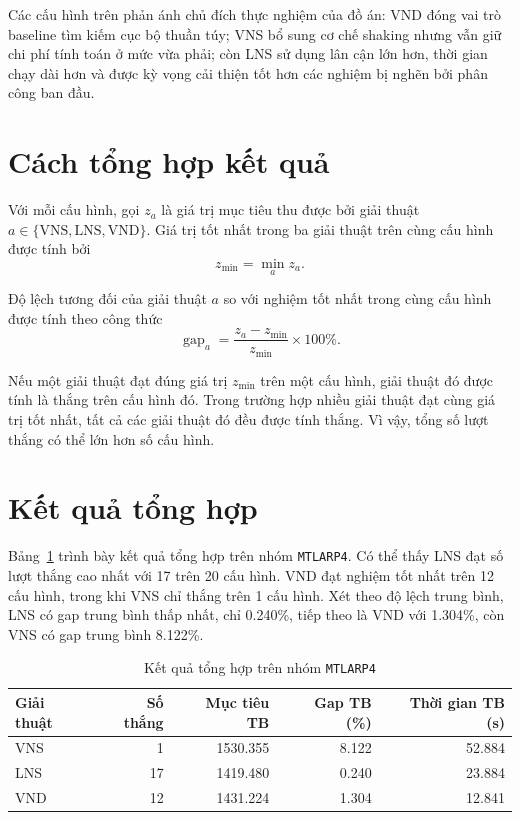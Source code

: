 Các cấu hình trên phản ánh chủ đích thực nghiệm của đồ án: VND đóng vai trò baseline tìm kiếm cục bộ thuần túy; VNS bổ sung cơ chế shaking nhưng vẫn giữ chi phí tính toán ở mức vừa phải; còn LNS sử dụng lân cận lớn hơn, thời gian chạy dài hơn và được kỳ vọng cải thiện tốt hơn các nghiệm bị nghẽn bởi phân công ban đầu.

\section{Cách tổng hợp kết quả}
\label{sec:experiment-metrics}

Với mỗi cấu hình, gọi \(z_a\) là giá trị mục tiêu thu được bởi giải thuật \(a \in \{\text{VNS},\text{LNS},\text{VND}\}\). Giá trị tốt nhất trong ba giải thuật trên cùng cấu hình được tính bởi
\begin{equation}
z_{\min} = \min_a z_a.
\end{equation}

Độ lệch tương đối của giải thuật \(a\) so với nghiệm tốt nhất trong cùng cấu hình được tính theo công thức
\begin{equation}
\operatorname{gap}_a =
\frac{z_a - z_{\min}}{z_{\min}} \times 100\%.
\end{equation}

Nếu một giải thuật đạt đúng giá trị \(z_{\min}\) trên một cấu hình, giải thuật đó được tính là thắng trên cấu hình đó. Trong trường hợp nhiều giải thuật đạt cùng giá trị tốt nhất, tất cả các giải thuật đó đều được tính thắng. Vì vậy, tổng số lượt thắng có thể lớn hơn số cấu hình.

\section{Kết quả tổng hợp}
\label{sec:experiment-summary}

Bảng~\ref{tab:summary-mtlarp4} trình bày kết quả tổng hợp trên nhóm \texttt{MTLARP4}. Có thể thấy LNS đạt số lượt thắng cao nhất với 17 trên 20 cấu hình. VND đạt nghiệm tốt nhất trên 12 cấu hình, trong khi VNS chỉ thắng trên 1 cấu hình. Xét theo độ lệch trung bình, LNS có gap trung bình thấp nhất, chỉ 0.240\%, tiếp theo là VND với 1.304\%, còn VNS có gap trung bình 8.122\%.

\begin{table}[H]
\centering
\caption{Kết quả tổng hợp trên nhóm \texttt{MTLARP4}}
\label{tab:summary-mtlarp4}
\begin{tabular}{lrrrr}
\toprule
\textbf{Giải thuật} & \textbf{Số thắng} & \textbf{Mục tiêu TB} & \textbf{Gap TB (\%)} & \textbf{Thời gian TB (s)} \\
\midrule
VNS & 1  & 1530.355 & 8.122 & 52.884 \\
LNS & 17 & 1419.480 & 0.240 & 23.884 \\
VND & 12 & 1431.224 & 1.304 & 12.841 \\
\bottomrule
\end{tabular}
\end{table}

